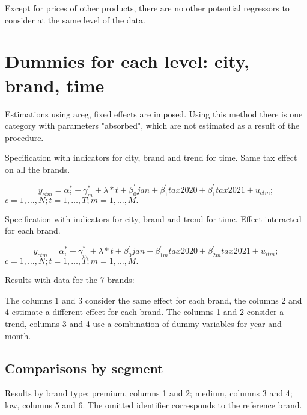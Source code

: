 \documentclass[]{article}
\begin{document}
Except for prices of other products, there are no other potential regressors to consider at the same level of the data.

\section{Dummies for each level: city, brand, time}
Estimations using areg, fixed effects are imposed. Using  this method there is one category with parameters "absorbed", which are not estimated as a result of the procedure.

Specification with indicators for city, brand and trend for time.
Same tax effect on all the brands.

\begin{equation*} 
y_{ctm}  = \alpha_{i}^{*} + \gamma_{m}^{*} + \lambda*t + \beta_{0}^{'}jan + \beta_{1}^{'}tax2020 + \beta_{1}^{'}tax2021 + u_{ctm}
;   \tag{2.1}
\end{equation*}
$c  = 1,\ldots,N;  t=1,\ldots,T; m=1,\ldots,M. $

Specification with indicators for city, brand and trend for time.
Effect interacted for each brand.

\begin{equation*} 
	y_{ctm}  = \alpha_{i}^{*} + \gamma_{m}^{*} + \lambda*t + \beta_{0}^{'}jan + \beta_{1m}^{'}tax2020 + \beta_{2m}^{'}tax2021 + u_{itm}
	;   \tag{2.2}
\end{equation*}
$c  = 1,\ldots,N;  t=1,\ldots,T; m=1,\ldots,M. $

Results with data for the 7 brands:


%

The columns 1 and 3 consider the same effect for each brand, the columns 2 and 4 estimate a different effect for each brand. The columns 1 and 2 consider a trend, columns 3 and 4 use a combination of dummy variables for year and month.

\subsection{Comparisons by segment}
Results by brand type: premium, columns 1 and 2; medium, columns 3 and 4; low, columns 5 and 6.
The omitted identifier corresponds to the reference brand.

	
%
\end{document}
